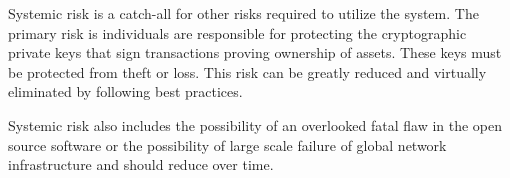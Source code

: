 Systemic risk is a catch-all for other risks required to utilize the system.
The primary risk is individuals are responsible for protecting the
cryptographic private keys that sign transactions proving ownership of assets.
These keys must be protected from theft or loss. This risk can be greatly
reduced and virtually eliminated by following best practices.


Systemic risk also includes the possibility of an overlooked fatal flaw in the
open source software or the possibility of large scale failure of global
network infrastructure and should reduce over time.

